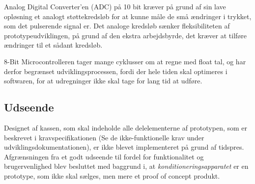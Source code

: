 Analog Digital Converter'en (ADC) på 10 bit kræver på grund af sin lave opløsning et analogt støttekredsløb for at kunne måle de små ændringer i trykket, som det pulserende signal er. Det analoge kredsløb sænker fleksibiliteten af prototypeudviklingen, på grund af den ekstra arbejdsbyrde, det kræver at tilføre ændringer til et sådant kredsløb.

8-Bit Microcontrolleren tager mange cyklusser om at regne med float tal, og har derfor begrænset udviklingsprocessen, fordi der hele tiden skal optimeres i softwaren, for at udregninger ikke skal tage for lang tid at udføre.


\subsection{Udseende}
Designet af kassen, som skal indeholde alle delelementerne af prototypen, som er beskrevet i kravspecifikationen (Se de ikke-funktionelle krav under udviklingsdokumentationen), er ikke blevet implementeret på grund af tidspres. Afgrænsningen fra et godt udseende til fordel for funktionalitet og brugervenlighed blev besluttet med baggrund i, at \textit{konditioneringsapparatet} er en prototype, som ikke skal sælges, men mere et proof of concept produkt. 
